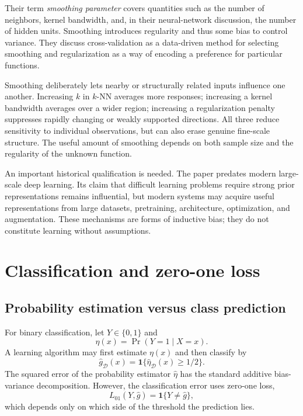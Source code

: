 \documentclass[11pt,a4paper]{article}
\newcommand{\ind}{\mathbf{1}}
\begin{document}
Their term \emph{smoothing parameter} covers quantities such as the number of neighbors, kernel bandwidth, and, in their neural-network discussion, the number of hidden units. Smoothing introduces regularity and thus some bias to control variance. They discuss cross-validation as a data-driven method for selecting smoothing and regularization as a way of encoding a preference for particular functions.

Smoothing deliberately lets nearby or structurally related inputs influence one another. Increasing $k$ in $k$-NN averages more responses; increasing a kernel bandwidth averages over a wider region; increasing a regularization penalty suppresses rapidly changing or weakly supported directions. All three reduce sensitivity to individual observations, but can also erase genuine fine-scale structure. The useful amount of smoothing depends on both sample size and the regularity of the unknown function.

An important historical qualification is needed. The paper predates modern large-scale deep learning. Its claim that difficult learning problems require strong prior representations remains influential, but modern systems may acquire useful representations from large datasets, pretraining, architecture, optimization, and augmentation. These mechanisms are forms of inductive bias; they do not constitute learning without assumptions.

\section{Classification and zero-one loss}
\label{sec:classification}

\subsection{Probability estimation versus class prediction}

For binary classification, let $Y\in\{0,1\}$ and
\begin{equation}
  \eta(x)=\Pr(Y=1\mid X=x).
\end{equation}
A learning algorithm may first estimate $\eta(x)$ and then classify by
\begin{equation}
  \widehat g_{\mathcal D}(x)
  =\ind\{\widehat\eta_{\mathcal D}(x)\geq 1/2\}.
\end{equation}
The squared error of the probability estimator $\widehat\eta$ has the standard additive bias-variance decomposition. However, the classification error uses zero-one loss,
\begin{equation}
  L_{01}(Y,\widehat g)=\ind\{Y\neq\widehat g\},
\end{equation}
which depends only on which side of the threshold the prediction lies.
\end{document}
